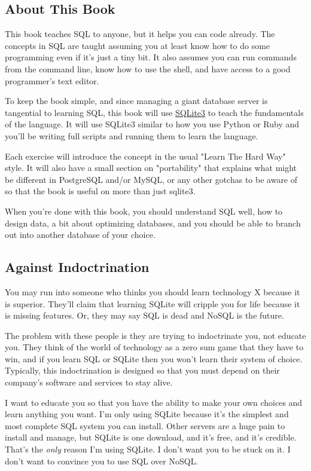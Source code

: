 \subsection*{About This Book}

This book teaches SQL to anyone, but it helps you can code already.  The 
concepts in SQL are taught assuming you at least know how to do some programming
even if it's just a tiny bit.  It also assumes you can run commands from the
command line, know how to use the shell, and have access to a good programmer's
text editor.

To keep the book simple, and since managing a giant database server is tangential
to learning SQL, this book will use \href{http://sqlite.org}{SQLite3} to teach
the fundamentals of the language.  It will use SQLite3 similar to how you use
Python or Ruby and you'll be writing full  scripts and running them
to learn the language.  

Each exercise will introduce the concept in the usual "Learn The Hard Way" style.
It will also have a small section on "portability" that explains what might be
different in PostgreSQL and/or MySQL, or any other gotchas to be aware of so that
the book is useful on more than just sqlite3.

When you're done with this book, you should understand SQL well, how to design
data, a bit about optimizing databases, and you should be able to branch out into
another database of your choice.


\subsection*{Against Indoctrination}

You may run into someone who thinks you should learn technology X because 
it is superior.  They'll claim that learning SQLite will cripple you for
life because it is missing features.  Or, they may say SQL is dead and
NoSQL is the future.

The problem with these people is they are trying to indoctrinate you, not
educate you.  They think of the world of technology as a zero sum game
that they have to win, and if you learn SQL or SQLite then you won't
learn their system of choice.  Typically, this indoctrination is designed
so that you must depend on their company's software and services to 
stay alive.

I want to educate you so that you have the ability to make your own choices and
learn anything you want.  I'm only using SQLite because it's the simplest and
most complete SQL system you can install.  Other servers are a huge pain to
install and manage, but SQLite is one download, and it's free, and it's
credible. That's the \emph{only} reason I'm using SQLite.  I don't want you to
be stuck on it.  I don't want to convince you to use SQL over NoSQL.

